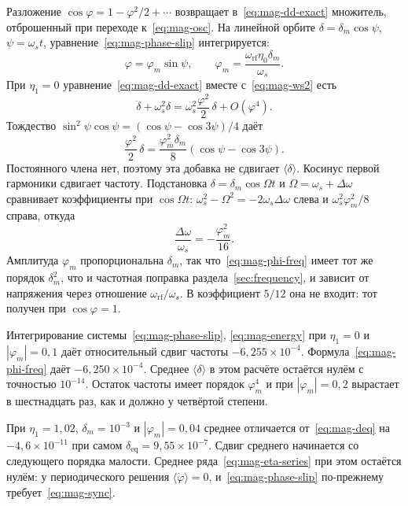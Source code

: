 \documentclass[aps,pra,preprint,a4paper,amsmath,amssymb,longbibliography]{revtex4-2}
\begin{document}
Разложение $\cos\varphi=1-\varphi^2/2+\cdots$ возвращает в~\eqref{eq:mag-dd-exact} множитель, отброшенный при переходе к~\eqref{eq:mag-osc}. На линейной орбите $\delta=\delta_m\cos\psi$, $\psi=\omega_s t$, уравнение~\eqref{eq:mag-phase-slip} интегрируется:
\begin{equation}
\label{eq:mag-phi-lin}
\varphi=\varphi_m\sin\psi,
\qquad
\varphi_m=\frac{\omega_{\mathrm{rf}}\eta_0\delta_m}{\omega_s}.
\end{equation}
При $\eta_1=0$ уравнение~\eqref{eq:mag-dd-exact} вместе с~\eqref{eq:mag-ws2} есть
\begin{equation}
\label{eq:mag-cos-corr}
\ddot\delta+\omega_s^2\delta
=\omega_s^2\frac{\varphi^2}{2}\,\delta+O(\varphi^4).
\end{equation}
Тождество $\sin^2\psi\cos\psi=(\cos\psi-\cos 3\psi)/4$ даёт
\begin{equation}
\label{eq:mag-phi2-fourier}
\frac{\varphi^2}{2}\,\delta
=\frac{\varphi_m^2\delta_m}{8}(\cos\psi-\cos 3\psi).
\end{equation}
Постоянного члена нет, поэтому эта добавка не сдвигает $\langle\delta\rangle$. Косинус первой гармоники сдвигает частоту. Подстановка $\delta=\delta_m\cos\Omega t$ и $\Omega=\omega_s+\Delta\omega$ сравнивает коэффициенты при $\cos\Omega t$: $\omega_s^2-\Omega^2=-2\omega_s\Delta\omega$ слева и $\omega_s^2\varphi_m^2/8$ справа, откуда
\begin{equation}
\label{eq:mag-phi-freq}
\frac{\Delta\omega}{\omega_s}=-\frac{\varphi_m^2}{16}.
\end{equation}
Амплитуда $\varphi_m$ пропорциональна $\delta_m$, так что~\eqref{eq:mag-phi-freq} имеет тот же порядок $\delta_m^2$, что и частотная поправка раздела~\ref{sec:frequency}, и зависит от напряжения через отношение $\omega_{\mathrm{rf}}/\omega_s$. В коэффициент $5/12$ она не входит: тот получен при $\cos\varphi=1$.

Интегрирование системы~\eqref{eq:mag-phase-slip}, \eqref{eq:mag-energy} при $\eta_1=0$ и $|\varphi_m|=0{,}1$ даёт относительный сдвиг частоты $-6{,}255\times 10^{-4}$. Формула~\eqref{eq:mag-phi-freq} даёт $-6{,}250\times 10^{-4}$. Среднее $\langle\delta\rangle$ в этом расчёте остаётся нулём с точностью $10^{-14}$. Остаток частоты имеет порядок $\varphi_m^4$ и при $|\varphi_m|=0{,}2$ вырастает в шестнадцать раз, как и должно у четвёртой степени.

При $\eta_1=1{,}02$, $\delta_m=10^{-3}$ и $|\varphi_m|=0{,}04$ среднее отличается от~\eqref{eq:mag-deq} на $-4{,}6\times 10^{-11}$ при самом $\delta_{\mathrm{eq}}=9{,}55\times 10^{-7}$. Сдвиг среднего начинается со следующего порядка малости. Среднее ряда~\eqref{eq:mag-eta-series} при этом остаётся нулём: у периодического решения $\langle\dot\varphi\rangle=0$, и~\eqref{eq:mag-phase-slip} по-прежнему требует~\eqref{eq:mag-sync}.
\end{document}

